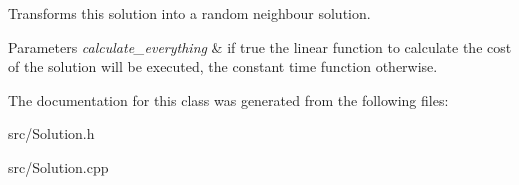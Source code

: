Transforms this solution into a random neighbour solution. 


\begin{DoxyParams}{Parameters}
{\em calculate\+\_\+everything} & if true the linear function to calculate the cost of the solution will be executed, the constant time function otherwise. \\
\hline
\end{DoxyParams}


The documentation for this class was generated from the following files\+:\begin{DoxyCompactItemize}
\item 
src/Solution.\+h\item 
src/Solution.\+cpp\end{DoxyCompactItemize}
